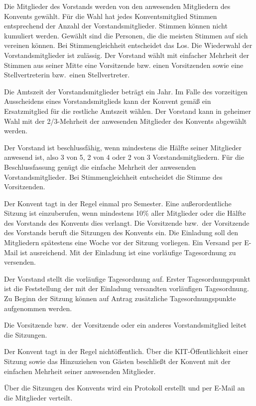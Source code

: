 \documentclass[a4paper, parskip=half, numbers=noenddot]{scrartcl}
\begin{document}
\begin{contract}
Die Mitglieder des Vorstands werden von den anwesenden Mitgliedern des Konvents gewählt. Für
die Wahl hat jedes Konventsmitglied Stimmen entsprechend der Anzahl der Vorstandsmitglieder. Stimmen können nicht kumuliert werden.
Gewählt sind die Personen, die die meisten Stimmen auf sich vereinen können. Bei Stimmengleichheit entscheidet das Los. Die Wiederwahl der Vorstandsmitglieder ist zulässig.
Der Vorstand wählt mit einfacher Mehrheit der Stimmen aus seiner Mitte eine Vorsitzende bzw.
einen Vorsitzenden sowie eine Stellvertreterin bzw.\ einen Stellvertreter.
\label{wahl}

Die Amtszeit der Vorstandsmitglieder beträgt ein Jahr. Im Falle des vorzeitigen Ausscheidens
eines Vorstandsmitglieds kann der Konvent gemäß  ein Ersatzmitglied für die restliche Amtszeit wählen. Der Vorstand kann in geheimer Wahl mit der 2/3-Mehrheit der anwesenden Mitglieder des Konvents abgewählt werden.

Der Vorstand ist beschlussfähig, wenn mindestens die Hälfte seiner Mitglieder anwesend ist, also 3 von 5, 2
von 4 oder 2 von 3 Vorstandsmitgliedern.
Für die Beschlussfassung genügt die einfache Mehrheit der anwesenden Vorstandsmitglieder. Bei Stimmengleichheit entscheidet die Stimme des Vorsitzenden.


Der Konvent tagt in der Regel einmal pro Semester. 
Eine außerordentliche Sitzung ist einzuberufen, wenn mindestens 10\% aller Mitglieder oder die Hälfte des Vorstands des Konvents dies verlangt.
Die Vorsitzende bzw.\ der Vorsitzende des Vorstands beruft die Sitzungen des Konvents ein.
Die Einladung soll den Mitgliedern spätestens eine Woche vor der Sitzung vorliegen. Ein Versand per E-Mail ist ausreichend. Mit der Einladung ist eine vorläufige Tagesordnung zu versenden.

Der Vorstand stellt die vorläufige Tagesordnung auf. Erster Tagesordnungspunkt ist die Feststellung der mit der Einladung versandten vorläufigen Tagesordnung. Zu Beginn der Sitzung können auf Antrag zusätzliche Tagesordnungspunkte aufgenommen werden.

Die Vorsitzende bzw.\ der Vorsitzende oder ein anderes Vorstandsmitglied leitet die Sitzungen.	

Der Konvent tagt in der Regel nichtöffentlich. Über die KIT-Öffentlichkeit einer Sitzung sowie das Hinzuziehen von Gästen beschließt der Konvent mit der einfachen Mehrheit seiner anwesenden Mitglieder.

Über die Sitzungen des Konvents wird ein Protokoll erstellt und per E-Mail an die Mitglieder verteilt.


\end{contract}
\end{document}
